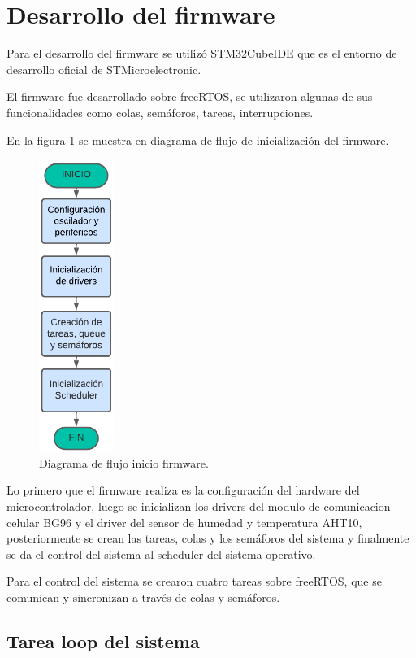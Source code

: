 \section{Desarrollo del firmware}

Para el desarrollo del firmware se utilizó STM32CubeIDE que es el entorno de desarrollo oficial de STMicroelectronic.

El firmware fue desarrollado sobre freeRTOS, se utilizaron algunas de sus funcionalidades como colas, semáforos, tareas, interrupciones.

En la figura \ref{fig:Df inicio firmware}  se muestra en diagrama de flujo de inicialización del firmware.

\begin{figure}[htbp]
  \centering
	\includegraphics[width=2.5cm, height=9.5cm]{./Figures/DF inicio firmware.png}
	\caption{Diagrama de flujo inicio firmware.}
	\label{fig:Df inicio firmware}
\end{figure}

Lo primero que el firmware realiza es la configuración del hardware del microcontrolador, luego se inicializan los drivers del modulo de comunicacion celular BG96 y el driver del sensor de humedad y temperatura AHT10, posteriormente se crean las tareas, colas y los semáforos del sistema y finalmente se da el control del sistema al scheduler del sistema operativo. 

Para el control del sistema se crearon cuatro tareas sobre freeRTOS, que se comunican y sincronizan a través de colas y semáforos.

\subsection{Tarea loop del sistema} 

